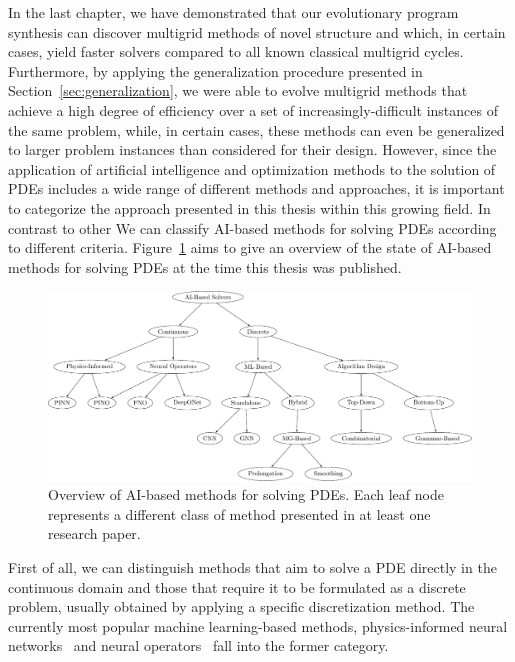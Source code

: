 In the last chapter, we have demonstrated that our evolutionary program synthesis can discover multigrid methods of novel structure and which, in certain cases, yield faster solvers compared to all known classical multigrid cycles.
Furthermore, by applying the generalization procedure presented in  Section~\ref{sec:generalization}, we were able to evolve multigrid methods that achieve a high degree of efficiency over a set of increasingly-difficult instances of the same problem, while, in certain cases, these methods can even be generalized to larger problem instances than considered for their design.
However, since the application of artificial intelligence and optimization methods to the solution of PDEs includes a wide range of different methods and approaches, it is important to categorize the approach presented in this thesis within this growing field.
In contrast to other %
We can classify AI-based methods for solving PDEs according to different criteria.
Figure~\ref{fig:overview-ai-based-methods} aims to give an overview of the state of AI-based methods for solving PDEs at the time this thesis was published.
\begin{figure}
	\includegraphics[width=\textwidth]{figures/trees/related_work.pdf}
	\caption{Overview of AI-based methods for solving PDEs. Each leaf node represents a different class of method presented in at least one research paper.}
	\label{fig:overview-ai-based-methods}
\end{figure}
First of all, we can distinguish methods that aim to solve a PDE directly in the continuous domain and those that require it to be formulated as a discrete problem, usually obtained by applying a specific discretization method.
The currently most popular machine learning-based methods, physics-informed neural networks~\cite{karniadakis2021physics,raissi2019physics,kharazmi2019variational,kharazmi2021hp} and neural operators~\cite{li2020fourier,guibas2021efficient,lu2021learning,li2021physics} fall into the former category.
